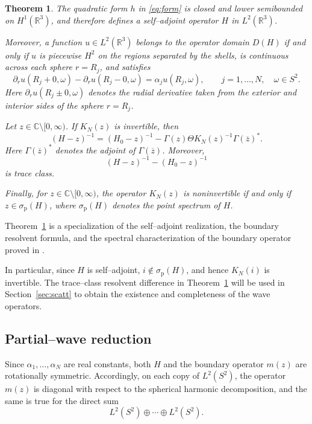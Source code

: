 \documentclass[a4paper,11pt]{article}
\numberwithin{equation}{section}
\newcommand{\R}{\mathbb{R}}
\newcommand{\C}{\mathbb{C}}
\newtheorem{thm}{Theorem}[section]
\theoremstyle{definition}
\theoremstyle{remark}
\begin{document}
\begin{thm}\label{thm:input}
The quadratic form $h$ in \eqref{eq:form} is closed and lower semibounded
on $H^1(\R^3)$, and therefore defines a self--adjoint operator $H$ in
$L^2(\R^3)$.

Moreover, a function $u\in L^2(\R^3)$ belongs to the operator domain $D(H)$
if and only if $u$ is piecewise $H^2$ on the regions separated by the shells,
is continuous across each sphere $r=R_j$, and satisfies
\begin{equation}\label{eq:jump-intro-model}
\partial_r u(R_j+0,\omega)-\partial_r u(R_j-0,\omega)
=
\alpha_j u(R_j,\omega),
\qquad
j=1,\ldots,N,
\quad
\omega\in S^2.
\end{equation}
Here $\partial_r u(R_j\pm0,\omega)$ denotes the radial derivative taken from
the exterior and interior sides of the sphere $r=R_j$.

Let $z\in\C\setminus[0,\infty)$. If $K_N(z)$ is invertible, then
\begin{equation}\label{eq:resolvent}
(H-z)^{-1}
=
(H_0-z)^{-1}
-\Gamma(z)\Theta K_N(z)^{-1}\Gamma(\overline{z})^*.
\end{equation}
Here $\Gamma(\overline{z})^*$ denotes the adjoint of $\Gamma(\overline{z})$.
Moreover,
$$
(H-z)^{-1}-(H_0-z)^{-1}
$$
is trace class.

Finally, for $z\in\C\setminus[0,\infty)$, the operator $K_N(z)$ is
noninvertible if and only if $z\in\sigma_{\mathrm p}(H)$, where
$\sigma_{\mathrm p}(H)$ denotes the point spectrum of $H$.
\end{thm}

Theorem~\ref{thm:input} is a specialization of the self--adjoint realization,
the boundary resolvent formula, and the spectral characterization of the
boundary operator proved in \cite{KaminagaAAMP2026}.

In particular, since $H$ is self--adjoint, $i\notin\sigma_{\mathrm p}(H)$,
and hence $K_N(i)$ is invertible. The trace--class resolvent difference in
Theorem~\ref{thm:input} will be used in Section~\ref{sec:scatt} to obtain
the existence and completeness of the wave operators.

\subsection{Partial--wave reduction}

Since $\alpha_1,\ldots,\alpha_N$ are real constants, both $H$ and the boundary
operator $m(z)$ are rotationally symmetric. Accordingly, on each copy of
$L^2(S^2)$, the operator $m(z)$ is diagonal with respect to the spherical
harmonic decomposition, and the same is true for the direct sum
$$
L^2(S^2)\oplus\cdots\oplus L^2(S^2).
$$
\end{document}
